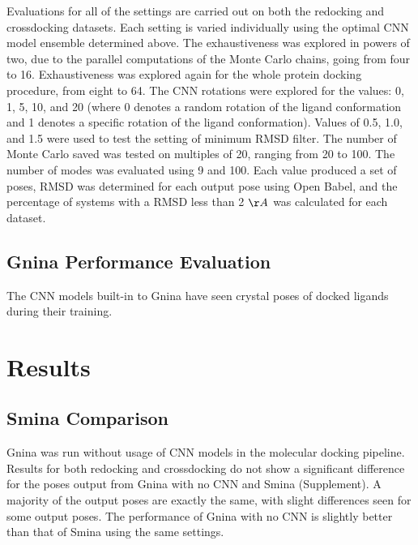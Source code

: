 \documentclass[journal=jcisd8,manuscript=article]{achemso}
\begin{document}
Evaluations for all of the settings are carried out on both the redocking and crossdocking datasets. Each setting is varied individually using the optimal CNN model ensemble determined above. The exhaustiveness was explored in powers of two, due to the parallel computations of the Monte Carlo chains, going from four to 16. Exhaustiveness was explored again for the whole protein docking procedure, from eight to 64. The CNN rotations were explored for the values: 0, 1, 5, 10, and 20 (where 0 denotes a random rotation of the ligand conformation and 1 denotes a specific rotation of the ligand conformation). Values of 0.5, 1.0, and 1.5 were used to test the setting of minimum RMSD filter. The number of Monte Carlo saved was tested on multiples of 20, ranging from 20 to 100. The number of modes was evaluated using 9 and 100. Each value produced a set of poses, RMSD was determined for each output pose using Open Babel, and the percentage of systems with a RMSD less than 2 $\AA$ was calculated for each dataset.

\subsection{Gnina Performance Evaluation}
The CNN models built-in to Gnina have seen crystal poses of docked ligands during their training. 

\section{Results}
\subsection{Smina Comparison}
Gnina was run without usage of CNN models in the molecular docking pipeline. Results for both redocking and crossdocking do not show a significant difference for the poses output from Gnina with no CNN and Smina (Supplement). A majority of the output poses are exactly the same, with slight differences seen for some output poses. The performance of Gnina with no CNN is slightly better than that of Smina using the same settings.
\end{document}
